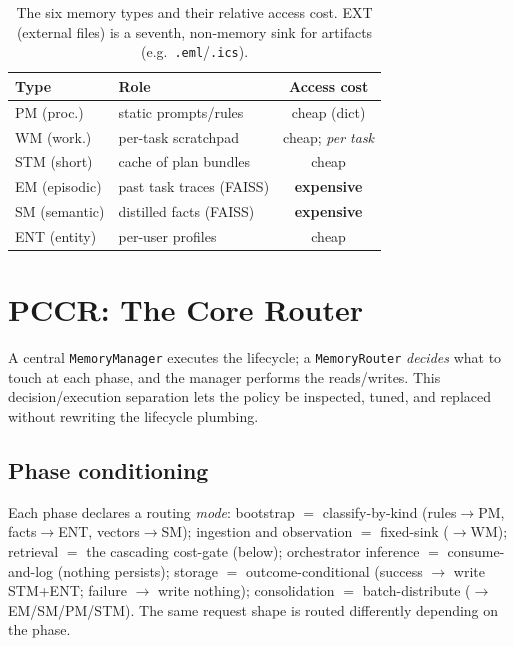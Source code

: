 \documentclass[10pt,twocolumn]{article}
\newcommand{\code}[1]{\texttt{\small #1}}
\begin{document}
\begin{table}[t]
\centering\small
\begin{tabular}{@{}llc@{}}
\toprule
Type & Role & Access cost \\
\midrule
PM (proc.)    & static prompts/rules        & cheap (dict) \\
WM (work.)    & per-task scratchpad         & cheap; \emph{per task} \\
STM (short)   & cache of plan bundles       & cheap \\
EM (episodic) & past task traces (FAISS)    & \textbf{expensive} \\
SM (semantic) & distilled facts (FAISS)     & \textbf{expensive} \\
ENT (entity)  & per-user profiles           & cheap \\
\bottomrule
\end{tabular}
\caption{The six memory types and their relative access cost. EXT (external
files) is a seventh, non-memory sink for artifacts (e.g.\ \code{.eml}/\code{.ics}).}
\label{tab:types}
\end{table}

\section{PCCR: The Core Router}\label{sec:pccr}
A central \code{MemoryManager} executes the lifecycle; a \code{MemoryRouter}
\emph{decides} what to touch at each phase, and the manager performs the
reads/writes. This decision/execution separation lets the policy be inspected,
tuned, and replaced without rewriting the lifecycle plumbing.

\subsection{Phase conditioning}\label{sec:phase}
Each phase declares a routing \emph{mode}: bootstrap $=$ classify-by-kind
(rules$\rightarrow$PM, facts$\rightarrow$ENT, vectors$\rightarrow$SM); ingestion
and observation $=$ fixed-sink ($\rightarrow$WM); retrieval $=$ the cascading
cost-gate (below); orchestrator inference $=$ consume-and-log (nothing persists);
storage $=$ outcome-conditional (success $\rightarrow$ write STM+ENT; failure
$\rightarrow$ write nothing); consolidation $=$ batch-distribute
($\rightarrow$EM/SM/PM/STM). The same request shape is routed differently
depending on the phase.
\end{document}
